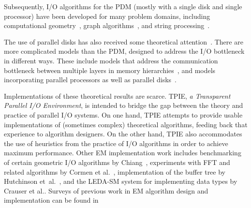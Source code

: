 Subsequently, I/O algorithms for the PDM (mostly with a
single disk and single processor) have been developed for
many problem domains, including computational
geometry~\cite{aapv-fibld-01,goodrich:external,arge:buffer,arge:theory,arge:gis,aamvv-empgbtag97,arge:interval,kanellakis:indexing,ramaswamy:path,subramanian:p-range,vengroff:efficient,agarwal:efficient,zhu:further,agarwal:point,arge:scalable,arge:theory,callahan:topology,franciosa:orders,grossi:cross-tree,arge:tpie},
 graph
algorithms~\cite{chiang:external,arge:buffer,kumar:improved,abello:functional,crauser:randomized,arge:obdd,feuerstein:memory,nodine:blocking,ullman:input},
 and string
processing~\cite{ferragina:fully,ferragina:fast,arge:strings,crauser:construction}.

The use of parallel disks
 has also received some
theoretical
attention~\cite{vitter:parmem1,nodine:deterministic,nodine:greed,dehne:efficient,dehne:reducing}.
There are more complicated models than the PDM, designed to address
the I/O bottleneck in different ways. These include models that
address the communication bottleneck between multiple layers in memory
hierarchies~\cite{}, and models incorporating
parallel processors as well as parallel
disks~\cite{cormen:challenge,dehne:efficient,dehne:reducing}.

Implementations of these theoretical results are scarce.
TPIE, \emph{a Transparent Parallel I/O Environment}, is
intended to bridge the gap between the theory and practice
of parallel I/O systems. On one hand, TPIE attempts to
provide usable implementations of (sometimes complex)
theoretical algorithms, feeding back that experience to
algorithm designers. On the other hand, TPIE also
accommodates the use of heuristics from the practice of I/O
algorithms in order to achieve maximum performance. Other EM
implementation work includes benchmarking of certain
geometric I/O algorithms by Chiang~\cite{chiang:experiments},
experiments with FFT and related algorithms by Cormen et
al.~\cite{cormen:ffts}, implementation of the buffer tree
\cite{arge:buffer} by Hutchinson et~al.~\cite{hutchinson:early}, and the
LEDA-SM system for
implementing data types by Crauser et al.\cite{mehlhorn:ledasm}.  Surveys
of previous work in EM algorithm design and implementation
can be found
in~\cite{arge:gisbook,arge:thesis,vitter:dimacssurvey}

